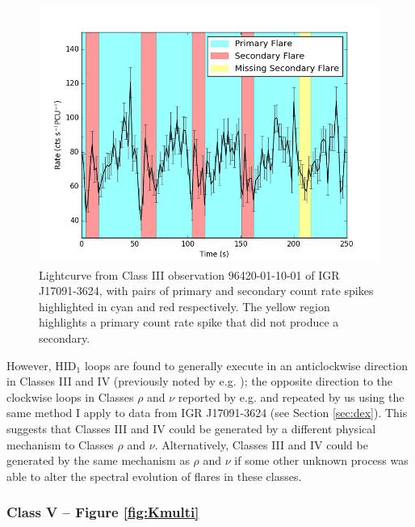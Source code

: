 \begin{figure}
    \includegraphics[width=\columnwidth, trim = 0mm 0mm 0mm 0mm]{images/classIIIsecpeak.png}
    \captionsetup{singlelinecheck=off}
    \caption[Lightcurve from Class III observation 96420-01-10-01 of IGR J17091-3624, with pairs of primary and secondary count rate spikes highlighted.]{Lightcurve from Class III observation 96420-01-10-01 of IGR J17091-3624, with pairs of primary and secondary count rate spikes highlighted in cyan and red respectively.  The yellow region highlights a primary count rate spike that did not produce a secondary.}
   \label{fig:III_IV_spike}
\end{figure}

\par However, HID$_1$ loops are found to generally execute in an anticlockwise direction in Classes III and IV (previously noted by e.g. \citealp{Altamirano_IGR_FH}); the opposite direction to the clockwise loops in Classes $\rho$ and $\nu$ reported by e.g. \citealp{Belloni_GRS_MI} and repeated by us using the same method I apply to data from IGR J17091-3624 (see Section \ref{sec:dex}).  This suggests that Classes III and IV could be generated by a different physical mechanism to Classes $\rho$ and $\nu$.  Alternatively, Classes III and IV could be generated by the same mechanism as $\rho$ and $\nu$ if some other unknown process was able to alter the spectral evolution of flares in these classes.

\subsubsection{Class V -- Figure \ref{fig:Kmulti}}

